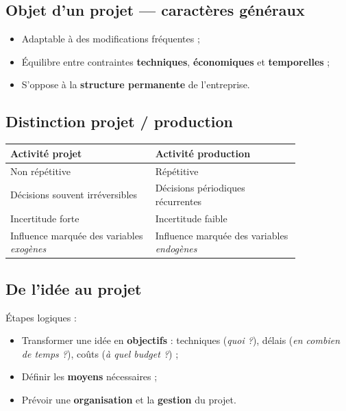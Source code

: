 \documentclass[11pt,a4paper]{article}
\begin{document}
\subsection{Objet d'un projet — caractères généraux}
\begin{itemize}[nosep]
  \item Adaptable à des modifications fréquentes ;
  \item Équilibre entre contraintes \textbf{techniques}, \textbf{économiques} et \textbf{temporelles} ;
  \item S'oppose à la \textbf{structure permanente} de l'entreprise.
\end{itemize}

\subsection{Distinction projet / production}
\begin{center}
\renewcommand{\arraystretch}{1.15}
\begin{tabular}{@{}>{\raggedright\arraybackslash}p{0.42\linewidth}>{\raggedright\arraybackslash}p{0.42\linewidth}@{}}
\toprule
\textbf{Activité projet} & \textbf{Activité production} \\
\midrule
Non répétitive & Répétitive \\
Décisions souvent irréversibles & Décisions périodiques récurrentes \\
Incertitude forte & Incertitude faible \\
Influence marquée des variables \emph{exogènes} & Influence marquée des variables \emph{endogènes} \\
\bottomrule
\end{tabular}
\end{center}

\subsection{De l'idée au projet}
Étapes logiques :
\begin{itemize}[nosep]
  \item Transformer une idée en \textbf{objectifs} : techniques (\emph{quoi ?}), délais (\emph{en combien de temps ?}), coûts (\emph{à quel budget ?}) ;
  \item Définir les \textbf{moyens} nécessaires ;
  \item Prévoir une \textbf{organisation} et la \textbf{gestion} du projet.
\end{itemize}
\end{document}
